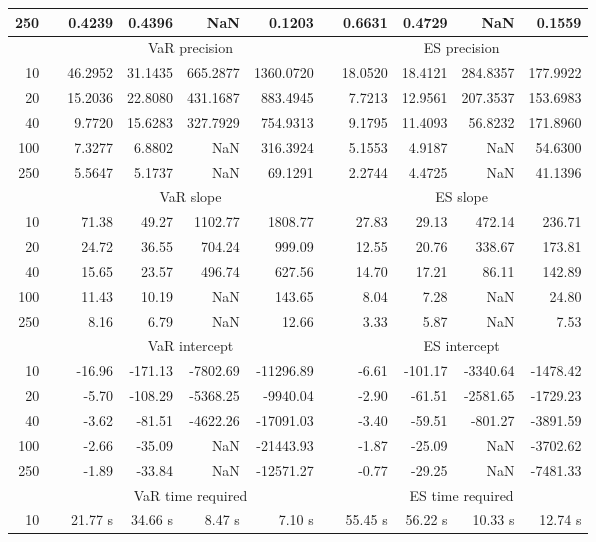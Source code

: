 {\begin{table}[h]
\begin{tabular}{rr rrrr r rrrr}
250 && 0.4239  & 0.4396  &    NaN & 0.1203 && 0.6631  & 0.4729  &    NaN & 0.1559 \\ 
\hline 
 & & \multicolumn{4}{c}{VaR precision} &&  \multicolumn{4}{c}{ES precision} \\ \cline{3-6}  \cline{8-11}
10 && 46.2952 & 31.1435 & 665.2877 & 1360.0720 & & 18.0520 & 18.4121 & 284.8357 & 177.9922 \\ 
20 && 15.2036 & 22.8080 & 431.1687 & 883.4945 & & 7.7213 & 12.9561 & 207.3537 & 153.6983 \\ 
40 && 9.7720 & 15.6283 & 327.7929 & 754.9313 & & 9.1795 & 11.4093 & 56.8232 & 171.8960 \\ 
100 && 7.3277 & 6.8802 &    NaN & 316.3924 & & 5.1553 & 4.9187 &    NaN & 54.6300 \\ 
250 && 5.5647 & 5.1737 &    NaN & 69.1291 & & 2.2744 & 4.4725 &    NaN & 41.1396 \\ 
\hline 
 & & \multicolumn{4}{c}{ VaR slope} && \multicolumn{4}{c}{ES slope} \\ \cline{3-6}  \cline{8-11}
10 && 71.38 & 49.27 & 1102.77 & 1808.77 && 27.83 & 29.13 & 472.14 & 236.71 \\ 
20 && 24.72 & 36.55 & 704.24 & 999.09 && 12.55 & 20.76 & 338.67 & 173.81 \\ 
40 && 15.65 & 23.57 & 496.74 & 627.56 && 14.70 & 17.21 & 86.11 & 142.89 \\ 
100 && 11.43 & 10.19 &  NaN & 143.65 && 8.04 & 7.28 &  NaN & 24.80 \\ 
250 && 8.16 & 6.79 &  NaN & 12.66 && 3.33 & 5.87 &  NaN & 7.53 \\ 
\hline 
 & & \multicolumn{4}{c}{ VaR intercept} &&  \multicolumn{4}{c}{ES intercept} \\ \cline{3-6}  \cline{8-11}
10 && -16.96 & -171.13 & -7802.69 & -11296.89 && -6.61 & -101.17 & -3340.64 & -1478.42 \\ 
20 && -5.70 & -108.29 & -5368.25 & -9940.04 && -2.90 & -61.51 & -2581.65 & -1729.23 \\ 
40 && -3.62 & -81.51 & -4622.26 & -17091.03 && -3.40 & -59.51 & -801.27 & -3891.59 \\ 
100 && -2.66 & -35.09 &  NaN & -21443.93 && -1.87 & -25.09 &  NaN & -3702.62 \\ 
250 && -1.89 & -33.84 &  NaN & -12571.27 && -0.77 & -29.25 &  NaN & -7481.33 \\ 
\hline 
 & & \multicolumn{4}{c}{VaR time required} && \multicolumn{4}{c}{ES time required} \\ \cline{3-6}  \cline{8-11}
10 & & 21.77 s & 34.66 s & 8.47 s & 7.10 s && 55.45 s & 56.22 s & 10.33 s & 12.74 s \\ 

\end{tabular}
\end{table}}
